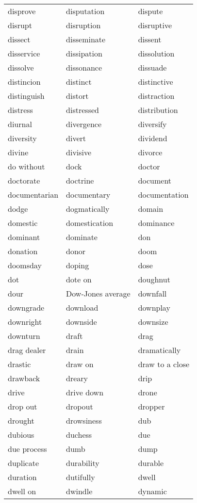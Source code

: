 \documentclass{minimal}
\begin{document}
\begin{longtable}{p{2.7cm}@{\hskip 0.2cm}p{2.7cm}@{\hskip 0.2cm}p{2.7cm}}
disprove & disputation & dispute \\
disrupt & disruption & disruptive \\
dissect & disseminate & dissent \\
disservice & dissipation & dissolution \\
dissolve & dissonance & dissuade \\
distincion & distinct & distinctive \\
distinguish & distort & distraction \\
distress & distressed & distribution \\
diurnal & divergence & diversify \\
diversity & divert & dividend \\
divine & divisive & divorce \\
do without & dock & doctor \\
doctorate & doctrine & document \\
documentarian & documentary & documentation \\
dodge & dogmatically & domain \\
domestic & domestication & dominance \\
dominant & dominate & don \\
donation & donor & doom \\
doomsday & doping & dose \\
dot & dote on & doughnut \\
dour & Dow-Jones average & downfall \\
downgrade & download & downplay \\
downright & downside & downsize \\
downturn & draft & drag \\
drag dealer & drain & dramatically \\
drastic & draw on & draw to a close \\
drawback & dreary & drip \\
drive & drive down & drone \\
drop out & dropout & dropper \\
drought & drowsiness & dub \\
dubious & duchess & due \\
due process & dumb & dump \\
duplicate & durability & durable \\
duration & dutifully & dwell \\
dwell on & dwindle & dynamic
\end{longtable}
\end{document}

